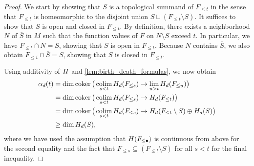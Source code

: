 \begin{proof}
	We start by showing that $S$ is a topological summand of $F_{\leq t}$ in the sense that $F_{\leq t}$ is homeomorphic to the disjoint union $S \sqcup (F_{\leq t} \setminus S)$.
	It suffices to show that $S$ is open and closed in $F_{\leq t}$.
	By definition, there exists a neighborhood $N$ of $\overline{S}$ in $M$ such that the function values of $F$ on $N \setminus S$ exceed $t$.
	In particular, we have $F_{\leq t} \cap N = S$, showing that $S$ is open in $F_{\leq t}$.
	Because $N$ contains $\overline{S}$, we also obtain $F_{\leq t} \cap \overline{S} = S$, showing that $S$ is closed in $F_{\leq t}$.

	Using additivity of $H$ and \cref{lem:birth_death_formulas}, we now obtain
	\begin{align*}
		\alpha_d(t) &= \dim \operatorname{coker} \big( \operatorname*{colim}_{s < t} H_d(F_{\leq s}) \to \lim_{u > t} H_d(F_{\leq u}) \big) \\
			&= \dim \operatorname{coker} \big( \operatorname*{colim}_{s < t} H_d(F_{\leq s}) \to H_d(F_{\leq t}) \big) \\
			&= \dim \operatorname{coker} \big( \operatorname*{colim}_{s < t} H_d(F_{\leq s}) \to H_d(F_{\leq t} \setminus S) \oplus H_d(S) \big) \\
			&\geq \dim H_d(S),
	\end{align*}
	where we have used the assumption that $H(F_{\leq \bullet})$ is continuous from above for the second equality and the fact that $F_{\leq s} \subseteq (F_{\leq t} \setminus S)$ for all $s < t$ for the final inequality.


\end{proof}
